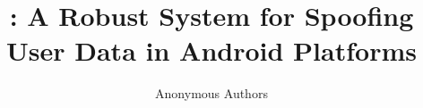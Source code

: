 
\title{\framework{}: A Robust System for Spoofing User Data in Android Platforms}

\author{Anonymous Authors}

\maketitle